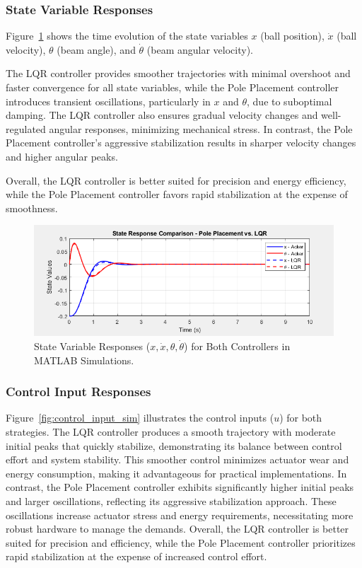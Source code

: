 \documentclass[conference]{IEEEtran}
\begin{document}
\subsubsection{State Variable Responses}
Figure~\ref{fig:state_sim} shows the time evolution of the state variables \(x\) (ball position), \(\dot{x}\) (ball velocity), \(\theta\) (beam angle), and \(\dot{\theta}\) (beam angular velocity). 

The LQR controller provides smoother trajectories with minimal overshoot and faster convergence for all state variables, while the Pole Placement controller introduces transient oscillations, particularly in \(x\) and \(\theta\), due to suboptimal damping. The LQR controller also ensures gradual velocity changes and well-regulated angular responses, minimizing mechanical stress. In contrast, the Pole Placement controller’s aggressive stabilization results in sharper velocity changes and higher angular peaks. 

Overall, the LQR controller is better suited for precision and energy efficiency, while the Pole Placement controller favors rapid stabilization at the expense of smoothness.

\begin{figure}[H]
    \centering
    \includegraphics[width=0.8\linewidth]{figures/state_sim.png}
    \caption{State Variable Responses (\(x, \dot{x}, \theta, \dot{\theta}\)) for Both Controllers in MATLAB Simulations.}
    \label{fig:state_sim}
\end{figure}

\subsubsection{Control Input Responses}
Figure~\ref{fig:control_input_sim} illustrates the control inputs (\(u\)) for both strategies. The LQR controller produces a smooth trajectory with moderate initial peaks that quickly stabilize, demonstrating its balance between control effort and system stability. This smoother control minimizes actuator wear and energy consumption, making it advantageous for practical implementations. In contrast, the Pole Placement controller exhibits significantly higher initial peaks and larger oscillations, reflecting its aggressive stabilization approach. These oscillations increase actuator stress and energy requirements, necessitating more robust hardware to manage the demands. Overall, the LQR controller is better suited for precision and efficiency, while the Pole Placement controller prioritizes rapid stabilization at the expense of increased control effort.
\end{document}
